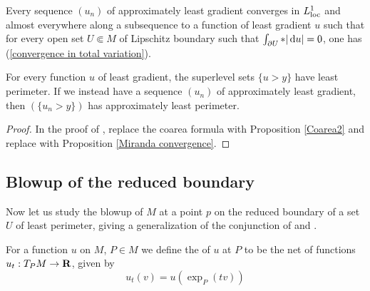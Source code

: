 \begin{corollary}\label{compactness}
Every sequence $(u_n)$ of approximately least gradient converges in $L^1_{\mathrm{loc}}$ and almost everywhere along a subsequence to a function of least gradient $u$ such that for every open set $U \Subset M$ of Lipschitz boundary such that $\int_{\partial U} *|\mathop{}\!\mathrm{d} u| = 0$, one has (\ref{convergence in total variation}).
\end{corollary}

\begin{proposition}\label{level sets are minimal}
For every function $u$ of least gradient, the superlevel sets $\{u > y\}$ have least perimeter.
If we instead have a sequence $(u_n)$ of approximately least gradient, then $(\{u_n > y\})$ has approximately least perimeter.
\end{proposition}
\begin{proof}
In the proof of \cite[Theorem 1]{BOMBIERI1969}, replace the coarea formula \cite[Theorem 1.6]{Miranda66} with Proposition \ref{Coarea2} and replace \cite[Teorema 3]{Miranda67} with Proposition \ref{Miranda convergence}.
\end{proof}


\subsection{Blowup of the reduced boundary}
Now let us study the blowup of $M$ at a point $p$ on the reduced boundary of a set $U$ of least perimeter, giving a generalization of the conjunction of \cite[Theorem 9.3]{Giusti77} and \cite[Theorem 6.2.2]{Simons68}.

\begin{definition}
For a function $u$ on $M$, $P \in M$ we define the  of $u$ at $P$ to be the net of functions $u_t: T_PM \to \mathbf{R}$, given by
$$u_t(v) = u\left(\exp_P(tv)\right)$$
\end{definition}

